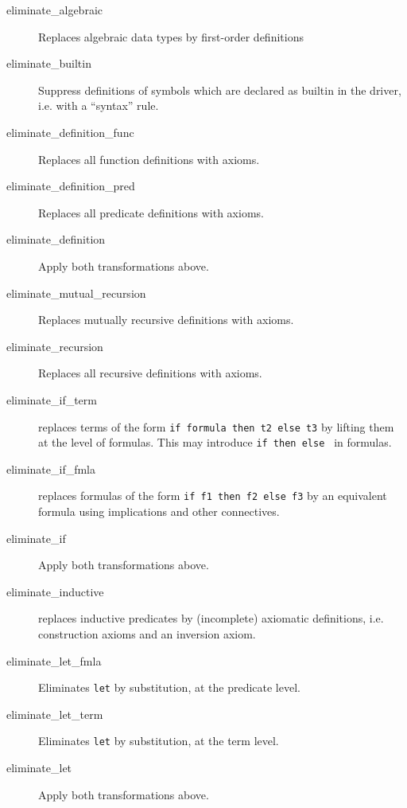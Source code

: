 \begin{description}

\item[eliminate\_algebraic] Replaces algebraic data types by first-order
definitions~\cite{paskevich09rr}

\item[eliminate\_builtin] Suppress definitions of symbols which are
  declared as builtin in the driver, i.e. with a ``syntax'' rule.
\item[eliminate\_definition\_func]
  Replaces all function definitions with axioms.
\item[eliminate\_definition\_pred]
  Replaces all predicate definitions with axioms.
\item[eliminate\_definition]
  Apply both transformations above.
\item[eliminate\_mutual\_recursion]
  Replaces mutually recursive definitions with axioms.
\item[eliminate\_recursion]
  Replaces all recursive definitions with axioms.

\item[eliminate\_if\_term] replaces terms of the form \texttt{if
    formula then t2 else t3} by lifting them at the level of formulas.
  This may introduce \texttt{if then else } in formulas.

\item[eliminate\_if\_fmla] replaces formulas of the form \texttt{if f1 then f2
  else f3} by an equivalent formula using implications and other
  connectives.

\item[eliminate\_if]
  Apply both transformations above.

\item[eliminate\_inductive] replaces inductive predicates by
  (incomplete) axiomatic definitions, i.e. construction axioms and
  an inversion axiom.

\item[eliminate\_let\_fmla]
  Eliminates \texttt{let} by substitution, at the predicate level.

\item[eliminate\_let\_term]
  Eliminates \texttt{let} by substitution, at the term level.

\item[eliminate\_let]
  Apply both transformations above.




\end{description}
